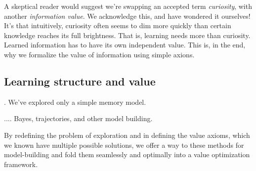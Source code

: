 \documentclass[9pt,twocolumn,twoside]{pnas-new}
\begin{document}
A skeptical reader would suggest we're swapping an accepted term \textit{curiosity}, with another \textit{information value}. We acknowledge this, and have wondered it ourselves! It's that intuitively, curiosity often seems to dim more quickly than certain knowledge reaches its full brightness. That is, learning needs more than curiosity. Learned information has to have its own independent value. This is, in the end, why we formalize the value of information using simple axions. 

\subsection*{Learning structure and value}.
We've explored only a simple memory model. 

.... Bayes, trajectories, and other model building.

By redefining the problem of exploration and in defining the value axioms, which we known have multiple possible solutions, we offer a way to these methods for model-building and fold them seamlessly and optimally into a value optimization framework. 


\end{document}
